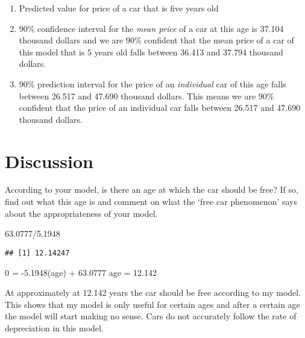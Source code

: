 \documentclass[
]{article}
\newenvironment{Shaded}{\begin{snugshade}}{\end{snugshade}}
\newcommand{\FloatTok}[1]{\textcolor[rgb]{0.00,0.00,0.81}{#1}}
\newcommand{\SpecialCharTok}[1]{\textcolor[rgb]{0.00,0.00,0.00}{#1}}
\begin{document}
\begin{enumerate}
\def\labelenumi{\arabic{enumi}.}
\item
  Predicted value for price of a car that is five years old
\item
  90\% confidence interval for the \emph{mean price} of a car at this
  age is 37.104 thousand dollars and we are 90\% confident that the mean
  price of a car of this model that is 5 years old falls between 36.413
  and 37.794 thousand dollars.
\item
  90\% prediction interval for the price of an \emph{individual} car of
  this age falls between 26.517 and 47.690 thousand dollars. This means
  we are 90\% confident that the price of an individual car falls
  between 26.517 and 47.690 thousand dollars.
\end{enumerate}

\hypertarget{discussion}{%
\section{Discussion}\label{discussion}}

According to your model, is there an age at which the car should be
free? If so, find out what this age is and comment on what the `free car
phenomenon' says about the appropriateness of your model.

\begin{Shaded}
\begin{Highlighting}[]
\FloatTok{63.0777}\SpecialCharTok{/}\FloatTok{5.1948}
\end{Highlighting}
\end{Shaded}

\begin{verbatim}
## [1] 12.14247
\end{verbatim}

0 = -5.1948(age) + 63.0777 age = 12.142

At approximately at 12.142 years the car should be free according to my
model. This shows that my model is only useful for certain ages and
after a certain age the model will start making no sense. Cars do not
accurately follow the rate of depreciation in this model.
\end{document}

